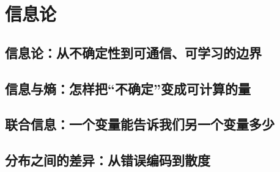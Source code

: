 \documentclass[UTF8,openany]{ctexbook}
\theoremstyle{definition}
\theoremstyle{plain}
\begin{document}
\part{信息论}
\chapter*{信息论：从不确定性到可通信、可学习的边界}
\label{ch:053}

\clearpage
\chapter*{信息与熵：怎样把``不确定''变成可计算的量}
\label{ch:054}





\clearpage
\chapter*{联合信息：一个变量能告诉我们另一个变量多少}
\label{ch:055}





\clearpage
\chapter*{分布之间的差异：从错误编码到散度}
\label{ch:056}




\clearpage
\end{document}
